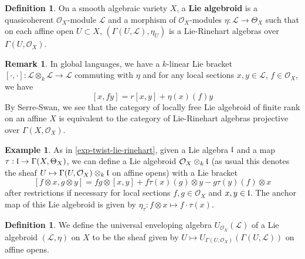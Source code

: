 \documentclass[11pt, a4paper]{article}
\theoremstyle{definition}
\newtheorem{remark}[theorem]{Remark}
\newtheorem{example}[theorem]{Example}
\newtheorem{definition}[theorem]{Definition}
\begin{document}
    \begin{definition}
        On a smooth algebraic variety $X$, a \textbf{Lie algebroid} is a quasicoherent $\mathcal O_X$-module $\mathcal L$ and a morphism of $\mathcal O_X$-modules $\eta:\mathcal L\to\Theta_X$ such that on each affine open $U\subset X$, $(\Gamma(U,\mathcal L),\eta_U)$ is a Lie-Rinehart algebras over $\Gamma(U,\mathcal O_X)$.
    \end{definition}
    \begin{remark}
        In global languages, we have a $k$-linear Lie bracket $[\cdot,\cdot]:\mathcal L\otimes_k\mathcal L\to \mathcal L$ commuting with $\eta$ and for any local sections $x, y\in\mathcal L$, $f\in\mathcal O_X$, we have
        \[[x, fy]=r[x, y]+\eta(x)(f)y\]
        By Serre-Swan, we see that the category of locally free Lie algebroid of finite rank on an affine $X$ is equivalent to the category of Lie-Rinehart algebras projective over $\Gamma(X, \mathcal O_X)$.
    \end{remark}
    \begin{example}\label{exp-universal-lie-algebroid}
        As in \cref{exp-twist-lie-rinehart}, given a Lie algebra $\mathfrak l$ and a map $\tau:\mathfrak l\to\Gamma(X, \Theta_X)$, we can define a Lie algebroid $\mathcal O_X\otimes_k\mathfrak l$ (as usual this denotes the sheaf $U\mapsto \Gamma(U, \mathcal O_X)\otimes_k\mathfrak l$ on affine opens) with a Lie bracket
        \[[f\otimes x, g\otimes y]=fg\otimes[x, y]+f\tau(x)(g)\otimes y-g\tau(y)(f)\otimes x\]
        after restrictions if necessary for local sections $f, g\in\mathcal O_X$ and $x, y\in\mathfrak l$. The anchor map of this Lie algebroid is given by $\eta_{\tau}:f\otimes x\mapsto f\cdot\tau(x)$.
    \end{example}
    \begin{definition}
        We define the universal enveloping algebra $U_{\mathcal O_X}(\mathcal L)$ of a Lie algebroid $(\mathcal L, \eta)$ on $X$ to be the sheaf given by $U\mapsto U_{\Gamma(U, \mathcal O_X)}(\Gamma(U, \mathcal L))$ on affine opens.
    \end{definition}
\end{document}
